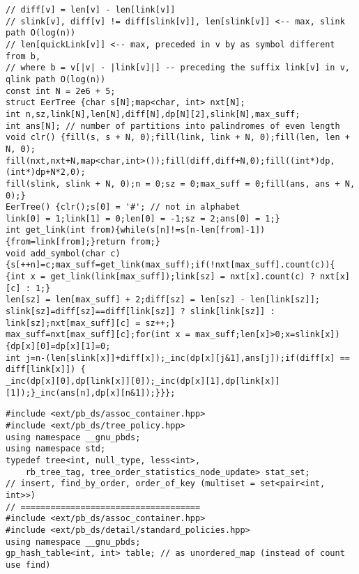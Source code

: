 \documentclass[a4paper,12pt]{article}
\begin{document}
\begin{verbatim}
// diff[v] = len[v] - len[link[v]]
// slink[v], diff[v] != diff[slink[v]], len[slink[v]] <-- max, slink path O(log(n))
// len[quickLink[v]] <-- max, preceded in v by as symbol different from b,
// where b = v[|v| - |link[v]|] -- preceding the suffix link[v] in v, qlink path O(log(n))
const int N = 2e6 + 5;
struct EerTree {char s[N];map<char, int> nxt[N];
int n,sz,link[N],len[N],diff[N],dp[N][2],slink[N],max_suff;
int ans[N]; // number of partitions into palindromes of even length
void clr() {fill(s, s + N, 0);fill(link, link + N, 0);fill(len, len + N, 0);
fill(nxt,nxt+N,map<char,int>());fill(diff,diff+N,0);fill((int*)dp,(int*)dp+N*2,0);
fill(slink, slink + N, 0);n = 0;sz = 0;max_suff = 0;fill(ans, ans + N, 0);}
EerTree() {clr();s[0] = '#'; // not in alphabet
link[0] = 1;link[1] = 0;len[0] = -1;sz = 2;ans[0] = 1;}
int get_link(int from){while(s[n]!=s[n-len[from]-1]){from=link[from];}return from;}
void add_symbol(char c) {s[++n]=c;max_suff=get_link(max_suff);if(!nxt[max_suff].count(c)){
{int x = get_link(link[max_suff]);link[sz] = nxt[x].count(c) ? nxt[x][c] : 1;}
len[sz] = len[max_suff] + 2;diff[sz] = len[sz] - len[link[sz]];
slink[sz]=diff[sz]==diff[link[sz]] ? slink[link[sz]] : link[sz];nxt[max_suff][c] = sz++;}
max_suff=nxt[max_suff][c];for(int x = max_suff;len[x]>0;x=slink[x]){dp[x][0]=dp[x][1]=0;
int j=n-(len[slink[x]]+diff[x]);_inc(dp[x][j&1],ans[j]);if(diff[x] == diff[link[x]]) {
_inc(dp[x][0],dp[link[x]][0]);_inc(dp[x][1],dp[link[x]][1]);}_inc(ans[n],dp[x][n&1]);}}};
\end{verbatim}

\begin{verbatim}
#include <ext/pb_ds/assoc_container.hpp>
#include <ext/pb_ds/tree_policy.hpp>
using namespace __gnu_pbds;
using namespace std;
typedef tree<int, null_type, less<int>, 
    rb_tree_tag, tree_order_statistics_node_update> stat_set;
// insert, find_by_order, order_of_key (multiset = set<pair<int, int>>)
// ====================================
#include <ext/pb_ds/assoc_container.hpp>
#include <ext/pb_ds/detail/standard_policies.hpp>
using namespace __gnu_pbds;
gp_hash_table<int, int> table; // as unordered_map (instead of count use find)
\end{verbatim}
\end{document}
